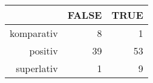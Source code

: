 \begin{tabular}{rrr}
  \hline
 & FALSE & TRUE \\ 
  \hline
komparativ & 8 & 1 \\ 
  positiv & 39 & 53 \\ 
  superlativ & 1 & 9 \\ 
   \hline
\end{tabular}
